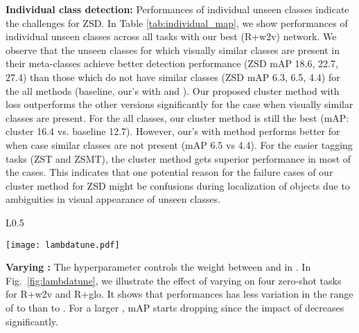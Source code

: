 \documentclass[runningheads]{llncs}
\begin{document}
\textbf{Individual class detection:} Performances of individual unseen classes indicate the challenges for ZSD. In Table \ref{tab:individual_map}, we show performances of individual unseen classes across all tasks with our best (R+w2v) network. We observe that the unseen classes for which visually similar classes are present in their meta-classes achieve better detection performance (ZSD mAP 18.6, 22.7, 27.4) than those which do not have similar classes (ZSD mAP 6.3, 6.5, 4.4) for the all methods (baseline, our's with  and ). Our proposed cluster method with loss  outperforms the other versions significantly for the case when visually similar classes are present. For the all classes, our cluster method is still the best (mAP: cluster 16.4 vs. baseline 12.7). However, our's with  method performs better for when case similar classes are not present (mAP 6.5 vs 4.4).
For the easier tagging tasks (ZST and ZSMT), the cluster method gets superior performance in most of the cases. This indicates that one potential reason for the failure cases of our cluster method for ZSD might be confusions during localization of objects due to ambiguities in visual appearance of unseen classes. 




\begin{wrapfigure}{L}{0.5\textwidth}
  \begin{center}
  \vspace{-3em}
   \texttt{[image: lambdatune.pdf]}
\end{center}
  \vspace{-2em}
   \caption{Effect of varying  in different zero-shot tasks for ResNet+w2v (left) and ResNet+glo (right).}
\label{fig:lambdatune}
\vspace{-4.0em}
\end{wrapfigure}

\textbf{Varying :} The hyperparameter  controls the weight between  and  in . In Fig.~\ref{fig:lambdatune}, we illustrate the effect of varying  on four zero-shot tasks for R+w2v and R+glo. It shows that performances has less variation in the range of  to  than  to . For a larger , mAP starts dropping  since the impact of  decreases significantly.

   
\end{document}
